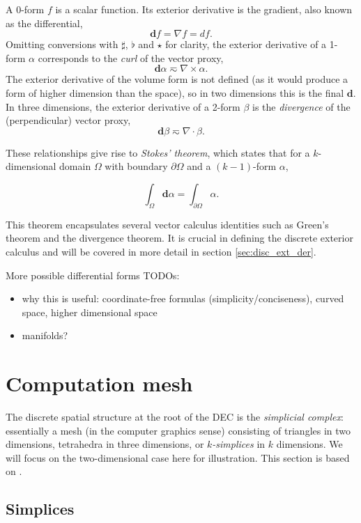 \documentclass[utf8,english]{gradu3}
\begin{document}
A 0-form $f$ is a scalar function.
Its exterior derivative is the gradient, also known as the differential,
\[
  \mathbf{d}f = \nabla f = df.
\]
Omitting conversions with $\sharp$, $\flat$ and $\star$ for clarity,
the exterior derivative of a 1-form $\alpha$ corresponds to the
\textit{curl} of the vector proxy,
\[
  \mathbf{d}\alpha \eqsim \nabla \times \alpha.
\]
The exterior derivative of the volume form is not defined
(as it would produce a form of higher dimension than the space),
so in two dimensions this is the final $\mathbf{d}$.
In three dimensions, the exterior derivative of a 2-form $\beta$
is the \textit{divergence} of the (perpendicular) vector proxy,
\[
  \mathbf{d}\beta \eqsim \nabla \cdot \beta.
\]

These relationships give rise to \textit{Stokes' theorem},
which states that for a $k$-dimensional domain $\Omega$
with boundary $\partial \Omega$ and a $(k-1)$-form $\alpha$,

\begin{equation}\label{eq:stokes_theorem}
  \int_{\Omega} \mathbf{d}\alpha = \int_{\partial\Omega} \alpha.
\end{equation}

This theorem encapsulates several vector calculus identities
such as Green's theorem and the divergence theorem.
It is crucial in defining the discrete exterior calculus
and will be covered in more detail in section \ref{sec:disc_ext_der}.

More possible differential forms TODOs:
\begin{itemize}
  \item why this is useful: coordinate-free formulas (simplicity/conciseness),
    curved space, higher dimensional space
  \item manifolds?
\end{itemize}


\section{Computation mesh}

The discrete spatial structure at the root of the DEC is the \textit{simplicial complex}:
essentially a mesh (in the computer graphics sense)
consisting of triangles in two dimensions,
tetrahedra in three dimensions, or \textit{$k$-simplices} in $k$ dimensions.
We will focus on the two-dimensional case here for illustration.
This section is based on \parencite{desbrun_discrete_2006}.


\subsection{Simplices}
\end{document}
